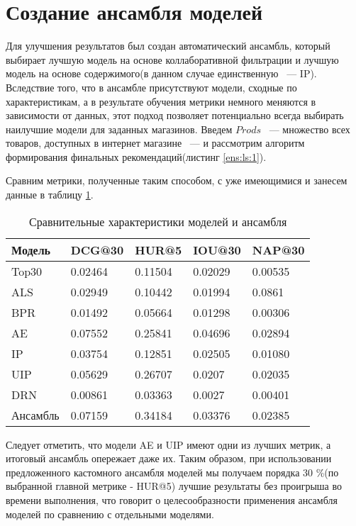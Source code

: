 \documentclass[14pt]{mmcs_article}
\begin{document}

\section{Создание ансамбля моделей}
Для улучшения результатов был создан автоматический ансамбль, который выбирает лучшую модель на основе коллаборативной фильтрации и лучшую модель на основе содержимого(в данном случае единственную ~--- IP).  Вследствие того, что в ансамбле присутствуют модели, сходные по характеристикам, а в результате обучения метрики немного меняются в зависимости от данных, этот подход позволяет потенциально всегда выбирать наилучшие модели для заданных магазинов.
Введем $Prods$ ~--- множество всех товаров, доступных в интернет магазине ~--- и рассмотрим алгоритм формирования финальных рекомендаций(листинг \ref{ens:ls:1}). 

Сравним метрики, полученные таким способом, с уже имеющимися и занесем данные в таблицу \ref{fin:table:1}.

\begin{table}[H]
	\centering
	\caption{Сравнительные характеристики моделей и ансамбля}\label{fin:table:1}

\begin{tabular}{| l |l| l| l| l|}
	\hline
	Модель & DCG@30 & HUR@5 & IOU@30 &  NAP@30 \\
	\hline
	Top30 & 0.02464 & 0.11504 & 0.02029 & 0.00535 \\
	\hline
	ALS & 0.02949 & 0.10442 & 0.01994 &  0.0861 \\
	\hline
	BPR & 0.01492 & 0.05664 & 0.01298 & 0.00306\\
	\hline
	AE & 0.07552 & 0.25841 & 0.04696 &  0.02894 \\
	\hline
	IP & 0.03754 & 0.12851 & 0.02505 & 0.01080 \\
	\hline
	UIP & 0.05629 & 0.26707 & 0.0207 &  0.02035 \\
	\hline
	DRN & 0.00861 & 0.03363 & 0.0027 & 0.00401 \\
	\hline
	Ансамбль & 0.07159 & 0.34184 & 0.03376 &  0.02385 \\
	\hline
\end{tabular}
\end{table}
Следует отметить, что модели AE и UIP имеют одни из лучших метрик, а итоговый ансамбль опережает даже их. Таким образом, при использовании предложенного кастомного ансамбля моделей мы получаем порядка 30 \%(по выбранной главной метрике - HUR@5) лучшие результаты без проигрыша во времени выполнения, что говорит о целесообразности применения ансамбля моделей по сравнению с отдельными моделями. %
\end{document}
